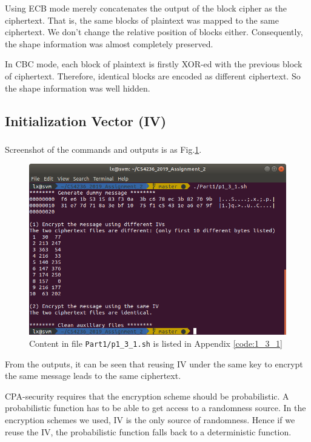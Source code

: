 Using ECB mode merely concatenates the output of the block cipher as the ciphertext. 
That is, the same blocks of plaintext was mapped to the same ciphertext.
We don't change the relative position of blocks either. Consequently, the shape information was almost completely preserved. 

In CBC mode, each block of plaintext is firstly XOR-ed with the previous block of ciphertext. Therefore, identical blocks are encoded as different ciphertext. So the shape information was well hidden. 

\subsection{Initialization Vector (IV)}

\subsubsection{}

Screenshot of the commands and outputs is as Fig.\ref{fig:p1_3_1}.

\begin{figure}[t!]
\centering
\includegraphics[width=\columnwidth]{resources/p1_3_1.png}
\caption{
    Content in file \texttt{Part1/p1\_3\_1.sh} is listed in Appendix \ref{code:1_3_1}
}
\label{fig:p1_3_1}
\end{figure}

From the outputs, it can be seen that reusing IV under the same key to encrypt the same message leads to the same ciphertext.

CPA-security requires that the encryption scheme should be probabilistic. 
A probabilistic function has to be able to get access to a randomness source.
In the encryption schemes we used, IV is the only source of randomness.
Hence if we reuse the IV, the probabilistic function falls back to a deterministic function.

